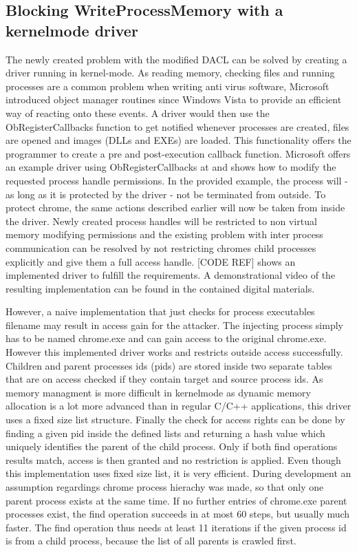 \subsection{Blocking WriteProcessMemory with a kernelmode driver}
The newly created problem with the modified DACL can be solved by creating a driver running in kernel-mode. As reading memory, checking files and running processes are a common problem when writing anti virus software, Microsoft introduced object manager routines since Windows Vista to provide an efficient way of reacting onto these events. A driver would then use the ObRegisterCallbacks function to get notified whenever processes are created, files are opened and images (DLLs and EXEs) are loaded. This functionality offers the programmer to create a pre and post-execution callback function. Microsoft offers an example driver using ObRegisterCallbacks at \cite{github_obcallback} and shows how to modify the requested process handle permissions. In the provided example, the process will - as long as it is protected by the driver - not be terminated from outside. To protect chrome, the same actions described earlier will now be taken from inside the driver. Newly created process handles will be restricted to non virtual memory modifying permissions and the existing problem with inter process communication can be resolved by not restricting chromes child processes explicitly and give them a full access handle. [CODE REF] shows an implemented driver to fulfill the requirements. A demonstrational video of the resulting implementation can be found in the contained digital materials.

However, a naive implementation that just checks for process executables filename may result in access gain for the attacker. The  injecting process simply has to be named chrome.exe and can gain access to the original chrome.exe. However this implemented driver works and restricts outside access successfully. Children and parent processes ids (pids) are stored inside two separate tables that are on access checked if they contain target and source process ids. As memory managment is more difficult in kernelmode as dynamic memory allocation is a lot more advanced than in regular C/C++ applications, this driver uses a fixed size list structure. Finally the check for access rights can be done by finding a given pid inside the defined lists and returning a hash value which uniquely identifies the parent of the child process. Only if both find operations results match, access is then granted and no restriction is applied. Even though this implementation uses fixed size list, it is very efficient. During development an assumption regardings chrome process hierachy was made, so that only one parent process exists at the same time. If no further entries of chrome.exe parent processes exist, the find operation succeeds in at most 60 steps, but usually much faster. The find operation thus needs at least 11 iterations if the given process id is from a child process, because the list of all parents is crawled first.

